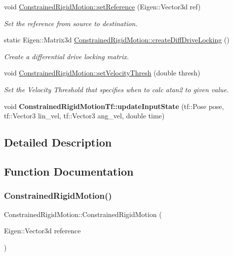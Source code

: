 \begin{DoxyCompactItemize}
void \hyperlink{group__RigidMotion_gac71f6e395c1d63f54cfb837b5526236b}{Constrained\+Rigid\+Motion\+::set\+Reference} (Eigen\+::\+Vector3d ref)
\begin{DoxyCompactList}\small\item\em Set the reference from source to destination. \end{DoxyCompactList}\item 
static Eigen\+::\+Matrix3d \hyperlink{group__RigidMotion_gad4fb6e13815454559ec7e52b291489af}{Constrained\+Rigid\+Motion\+::create\+Diff\+Drive\+Locking} ()
\begin{DoxyCompactList}\small\item\em Create a differential drive locking matrix. \end{DoxyCompactList}\item 
void \hyperlink{group__RigidMotion_ga70771b8bb17cff0ffceadae49eab9f8e}{Constrained\+Rigid\+Motion\+::set\+Velocity\+Thresh} (double thresh)
\begin{DoxyCompactList}\small\item\em Set the Velocity Threshold that specifies when to calc atan2 to given value. \end{DoxyCompactList}\item 
\mbox{\label{group__RigidMotion_gabb5eee0f91ee59d0eda733f8d5769094}} 
void {\bfseries Constrained\+Rigid\+Motion\+Tf\+::update\+Input\+State} (tf\+::\+Pose pose, tf\+::\+Vector3 lin\+\_\+vel, tf\+::\+Vector3 ang\+\_\+vel, double time)
\end{DoxyCompactItemize}


\subsection{Detailed Description}


\subsection{Function Documentation}
\mbox{\label{group__RigidMotion_ga603d9727e46dc49dcf22b24870d15779}} 
\subsubsection{\texorpdfstring{Constrained\+Rigid\+Motion()}{ConstrainedRigidMotion()}}
{\footnotesize\ttfamily Constrained\+Rigid\+Motion\+::\+Constrained\+Rigid\+Motion (\begin{DoxyParamCaption}\item[{Eigen\+::\+Vector3d}]{reference }\end{DoxyParamCaption})}


